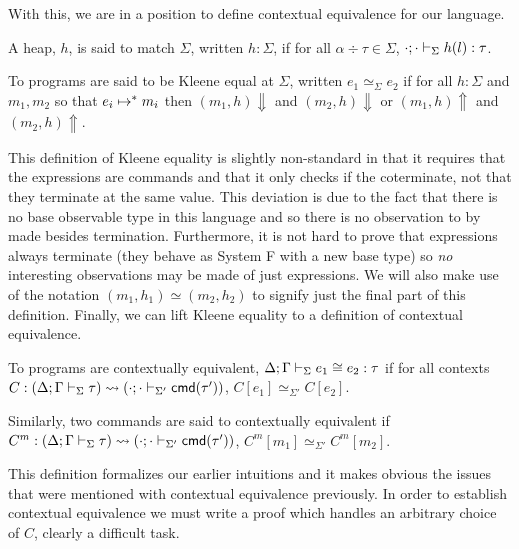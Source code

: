 With this, we are in a position to define contextual equivalence for
our language.
\begin{defn}\label{def:language:heapmatch}
  A heap, $h$, is said to match $\Sigma$, written $h : \Sigma$, if for
  all $\alpha \div \tau \in \Sigma$,
  $\cdot; \cdot \vdash_{\Sigma} h(l) \mathrel{:} \tau$.
\end{defn}
\begin{defn}\label{def:language:kleene}
  To programs are said to be Kleene equal at $\Sigma$, written
  $e_1 \simeq_\Sigma e_2$ if for all $h : \Sigma$ and $m_1, m_2$ so
  that $e_i \mapsto^* m_i$ then $(m_1, h) \Downarrow$ and
  $(m_2, h) \Downarrow$ or $(m_1, h) \Uparrow$ and
  $(m_2, h) \Uparrow$.
\end{defn}
This definition of Kleene equality is slightly non-standard in that it
requires that the expressions are commands and that it only checks if
the coterminate, not that they terminate at the same value. This
deviation is due to the fact that there is no base observable type in
this language and so there is no observation to by made besides
termination. Furthermore, it is not hard to prove that expressions
always terminate (they behave as System F with a new base type) so
\emph{no} interesting observations may be made of just expressions. We
will also make use of the notation $(m_1, h_1) \simeq (m_2, h_2)$ to
signify just the final part of this definition. Finally, we can lift
Kleene equality to a definition of contextual equivalence.
\begin{defn}\label{def:language:cxt}
  To programs are contextually equivalent,
  $\Delta; \Gamma \vdash_{\Sigma} e_1 \cong e_2 \mathrel{:} \tau$ if for all
  contexts
  $C : (\Delta; \Gamma \vdash_{\Sigma} \tau) \rightsquigarrow (\cdot; \cdot \vdash_{\Sigma'} \mathsf{cmd}(\tau'))$,
  $C[e_1] \simeq_{\Sigma'} C[e_2]$.

  Similarly, two commands are said to contextually equivalent if
  $C^m : (\Delta; \Gamma \vdash_{\Sigma} \tau) \rightsquigarrow (\cdot; \cdot \vdash_{\Sigma'} \mathsf{cmd}(\tau'))$,
  $C^m[m_1] \simeq_{\Sigma'} C^m[m_2]$.
\end{defn}
This definition formalizes our earlier intuitions and it makes obvious
the issues that were mentioned with contextual equivalence previously.
In order to establish contextual equivalence we must write a proof
which handles an arbitrary choice of $C$, clearly a difficult
task.

